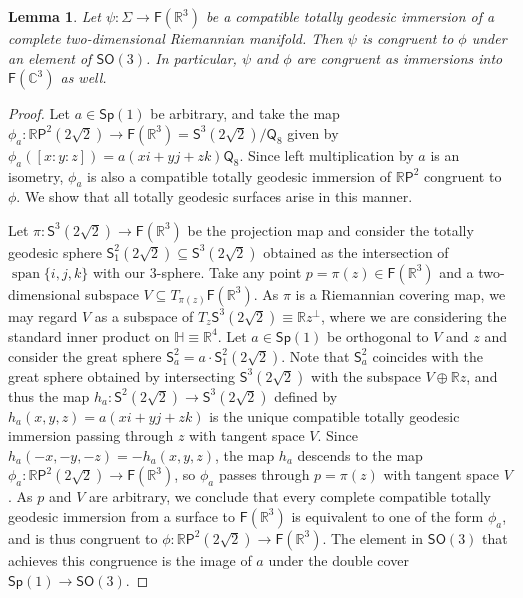 \documentclass[11pt,a4paper,final]{amsart}
\newcommand{\s}{\mathsf}
\newcommand{\R}{\mathbb{R}}
\newcommand{\C}{\mathbb{C}}
\newcommand{\spann}{\operatorname{span}}
\renewcommand{\H}{\mathbb{H}}
\newtheorem{lemma}[theorem]{Lemma}
\theoremstyle{definition}
\begin{document}
\begin{lemma}
	Let $\psi\colon \Sigma \to \s{F}(\R^{3})$ be a compatible totally geodesic immersion of a complete two-dimensional Riemannian manifold.
	Then $\psi$ is congruent to $\phi$ under an element of $\s{SO}(3)$.
	In particular, $\psi$ and $\phi$ are congruent as immersions into $\s{F}(\C^{3})$ as well.
\end{lemma}
\begin{proof}
	Let $a\in\s{Sp}(1)$ be arbitrary, and take the map $\phi_{a}\colon \R\s{P}^{2}(2\sqrt{2})\to \s{F}(\R^{3})=\s{S}^{3}(2\sqrt{2})/\s{Q}_{8}$ given by $\phi_{a}([x:y:z])=a(xi+yj+zk)\s{Q}_{8}$.
	Since left multiplication by $a$ is an isometry, $\phi_{a}$ is also a compatible totally geodesic immersion of $\R\s{P}^{2}$ congruent to $\phi$.
	We show that all totally geodesic surfaces arise in this manner.
	
	Let $\pi\colon \s{S}^{3}(2\sqrt{2})\to \s{F}(\R^{3})$ be the projection map and consider the totally geodesic sphere $\s{S}^{2}_{1}(2\sqrt{2})\subseteq \s{S}^{3}(2\sqrt{2})$ obtained as the intersection of $\spann\{i,j,k\}$ with our $3$-sphere.
	Take any point $p=\pi(z)\in\s{F}(\R^{3})$ and a two-dimensional subspace $V\subseteq T_{\pi(z)}\s{F}(\R^{3})$.
	As $\pi$ is a Riemannian covering map, we may regard $V$ as a subspace of $T_{z}\s{S}^{3}(2\sqrt{2})\equiv \R z ^{\perp}$, where we are considering the standard inner product on $\H\equiv \R^{4}$.
	Let $a\in \s{Sp}(1)$ be orthogonal to $V$ and $z$ and consider the great sphere $\s{S}^{2}_{a}=a\cdot \s{S}^{2}_{1}(2\sqrt{2})$.
	Note that $\s{S}^{2}_{a}$ coincides with the great sphere obtained by intersecting $\s{S}^{3}(2\sqrt{2})$ with the subspace $V\oplus \R z$, and thus the map $h_{a}\colon \s{S}^{2}(2\sqrt{2})\to \s{S}^{3}(2\sqrt{2})$ defined by $h_{a}(x,y,z)=a(xi+yj+zk)$ is the unique compatible totally geodesic immersion passing through $z$ with tangent space $V$.
	Since $h_{a}(-x,-y,-z)=-h_{a}(x,y,z)$, the map $h_{a}$ descends to the map $\phi_{a}\colon \R\s{P}^{2}(2\sqrt{2})\to \s{F}(\R^{3})$, so $\phi_{a}$ passes through $p=\pi(z)$ with tangent space $V$.
	As $p$ and $V$ are arbitrary, we conclude that every complete compatible totally geodesic immersion from a surface to $\s{F}(\R^{3})$ is equivalent to one of the form $\phi_{a}$, and is thus congruent to $\phi\colon \R\s{P}^{2}(2\sqrt{2})\to\s{F}(\R^{3})$.
	The element in $\s{SO}(3)$ that achieves this congruence is the image of $a$ under the double cover $\s{Sp}(1)\to \s{SO}(3)$. \qedhere
\end{proof}	
	
\end{document}
